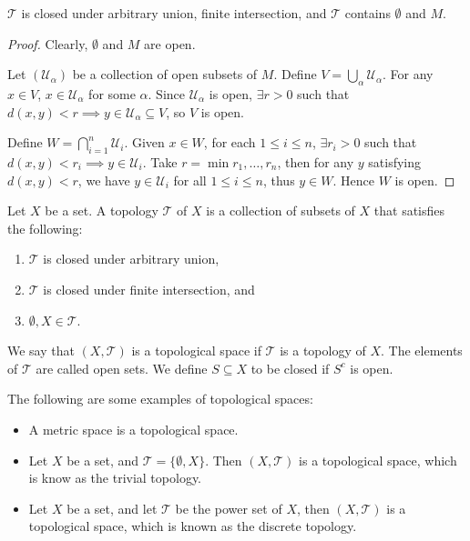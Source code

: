 \begin{prop}
    $\mathcal T$ is closed under arbitrary union, finite intersection, and $\mathcal T$ contains $\emptyset$ and $M$.

    \begin{proof}
        Clearly, $\emptyset$ and $M$ are open.

        Let $(\mathcal U_\alpha)$ be a collection of open subsets of $M$. Define $V = \bigcup_\alpha \mathcal U_\alpha$. For any $x\in V$, $x\in \mathcal U_\alpha$ for some $\alpha$. Since $\mathcal U_\alpha$ is open, $\exists r>0$ such that $d(x, y)<r \implies y\in \mathcal U_\alpha \subseteq V$, so $V$ is open.

        Define $W = \bigcap_{i=1}^n \mathcal U_i$. Given $x\in W$, for each $1\leq i\leq n$, $\exists r_i > 0$ such that $d(x, y) < r_i \implies y\in \mathcal U_i$. Take $r = \min{r_1, \ldots, r_n}$, then for any $y$ satisfying $d(x, y) < r$, we have $y\in \mathcal U_i$ for all $1\leq i\leq n$, thus $y\in W$. Hence $W$ is open.
    \end{proof}
\end{prop}

\begin{df}
    Let $X$ be a set. A topology $\mathcal T$ of $X$ is a collection of subsets of $X$ that satisfies the following:
    \begin{enumerate}[label={\alph*)}]
        \item $\mathcal T$ is closed under arbitrary union,
        \item $\mathcal T$ is closed under finite intersection, and
        \item $\emptyset, X \in \mathcal T$.
    \end{enumerate}
    We say that  $(X, \mathcal T)$ is a topological space if $\mathcal T$ is a topology of $X$. The elements of $\mathcal T$ are called open sets. We define $S\subseteq X$ to be closed if $S^c$ is open.
\end{df}

\begin{ex}
    The following are some examples of topological spaces:
    \begin{itemize}
        \item A metric space is a topological space.
        \item Let $X$ be a set, and $\mathcal T = \{\emptyset, X\}$. Then $(X, \mathcal T)$ is a topological space, which is know as the trivial topology.
        \item Let $X$ be a set, and let $\mathcal T$ be the power set of $X$, then $(X, \mathcal T)$ is a topological space, which is known as the discrete topology.
    \end{itemize}
\end{ex}

